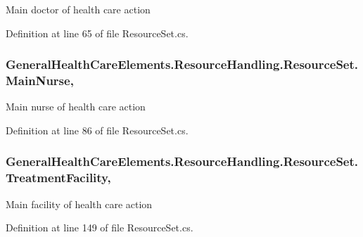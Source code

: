 Main doctor of health care action 



Definition at line 65 of file Resource\+Set.\+cs.

\subsubsection[{\texorpdfstring{Main\+Nurse}{MainNurse}}]{ General\+Health\+Care\+Elements.\+Resource\+Handling.\+Resource\+Set.\+Main\+Nurse\hspace{0.3cm}{\ttfamily [get]}, {\ttfamily [set]}}\hypertarget{class_general_health_care_elements_1_1_resource_handling_1_1_resource_set_a6fbeb8cff94dcf758d47676b78e917dd}{}\label{class_general_health_care_elements_1_1_resource_handling_1_1_resource_set_a6fbeb8cff94dcf758d47676b78e917dd}


Main nurse of health care action 



Definition at line 86 of file Resource\+Set.\+cs.

\subsubsection[{\texorpdfstring{Treatment\+Facility}{TreatmentFacility}}]{ General\+Health\+Care\+Elements.\+Resource\+Handling.\+Resource\+Set.\+Treatment\+Facility\hspace{0.3cm}{\ttfamily [get]}, {\ttfamily [set]}}\hypertarget{class_general_health_care_elements_1_1_resource_handling_1_1_resource_set_a3b0e82c6b530372dac28200b4b5230b8}{}\label{class_general_health_care_elements_1_1_resource_handling_1_1_resource_set_a3b0e82c6b530372dac28200b4b5230b8}


Main facility of health care action 



Definition at line 149 of file Resource\+Set.\+cs.

